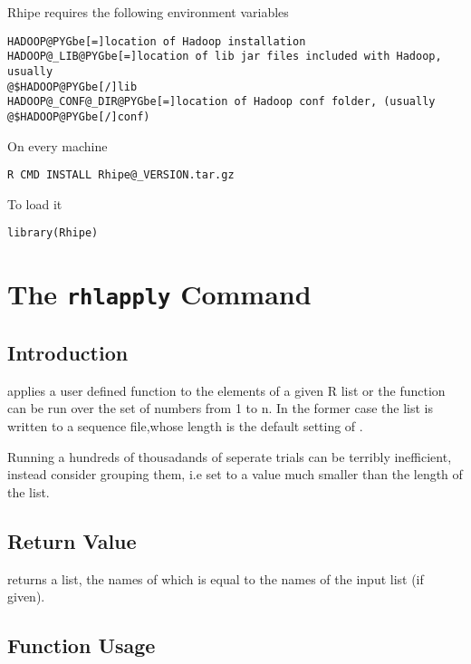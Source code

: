 \documentclass[letterpaper,10pt,english]{manual}
\begin{document}
Rhipe requires the following environment variables

\begin{Verbatim}[commandchars=@\[\]]
HADOOP@PYGbe[=]location of Hadoop installation
HADOOP@_LIB@PYGbe[=]location of lib jar files included with Hadoop, usually
@$HADOOP@PYGbe[/]lib
HADOOP@_CONF@_DIR@PYGbe[=]location of Hadoop conf folder, (usually @$HADOOP@PYGbe[/]conf)
\end{Verbatim}

On every machine

\begin{Verbatim}[commandchars=@\[\]]
R CMD INSTALL Rhipe@_VERSION.tar.gz
\end{Verbatim}

To load it

\begin{Verbatim}[commandchars=@\[\]]
library(Rhipe)
\end{Verbatim}

\resetcurrentobjects
\hypertarget{--doc-rhlapply}{}

\chapter{The \texttt{rhlapply} Command}


\section{Introduction}

 applies a user defined function to the elements of a given
R list or the function can be run over the set of numbers from 1 to
n. In the former case the list is written to a sequence file,whose length is the
default setting of .

Running a hundreds of thousadands of seperate trials
can be terribly inefficient, instead consider grouping them, i.e set
 to a value much smaller than the length of the
list.


\section{Return Value}

 returns a list, the names of which is equal to the names
of the input list (if given).


\section{Function Usage}
\end{document}
